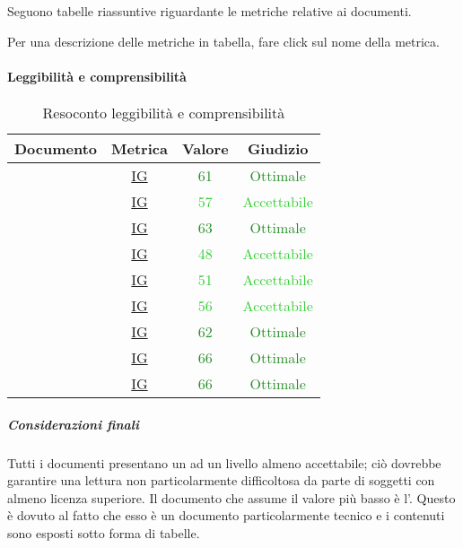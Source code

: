 	Seguono tabelle riassuntive riguardante le metriche relative ai documenti. 
	
	Per una descrizione delle metriche in tabella, fare click sul nome della metrica.
	
	\paragraph{Leggibilità e comprensibilità}
		\begin{table}[H]
			\centering
			\small
			\begin{tabular}{c | c | c | c}
				\hline
				\textbf{Documento} & \textbf{Metrica}    & \textbf{Valore} & \textbf{Giudizio} \\ \hline
					\pdpvdue        & \hyperref[MLEC]{IG} & \textcolor{ForestGreen}{61} & \textcolor{ForestGreen}{Ottimale} \\
					\pdqvdue        & \hyperref[MLEC]{IG} & \textcolor{LimeGreen}{57} & \textcolor{LimeGreen}{Accettabile} \\
					\ndpvdue        & \hyperref[MLEC]{IG} & \textcolor{ForestGreen}{63} & \textcolor{ForestGreen}{Ottimale} \\
					\adrvdue        & \hyperref[MLEC]{IG}  & \textcolor{LimeGreen}{48} & \textcolor{LimeGreen}{Accettabile} \\
					\stvuno		& \hyperref[MLEC]{IG}  & \textcolor{LimeGreen}{51} & \textcolor{LimeGreen}{Accettabile} \\
					\glvdue        & \hyperref[MLEC]{IG} & \textcolor{LimeGreen}{56} & \textcolor{LimeGreen}{Accettabile} \\
					\vcinquei       & \hyperref[MLEC]{IG}& \textcolor{ForestGreen}{62} & \textcolor{ForestGreen}{Ottimale} \\
					\vseii       & \hyperref[MLEC]{IG} &  \textcolor{ForestGreen}{66} & \textcolor{ForestGreen}{Ottimale} \\
					\vtree       & \hyperref[MLEC]{IG}& \textcolor{ForestGreen}{66} & \textcolor{ForestGreen}{Ottimale} \\
			\end{tabular}
			\caption{Resoconto leggibilità e comprensibilità}
			\label{tab_resoconto_leggibilità_e_comprensibilità2}
		\end{table}
	
		\subparagraph{Considerazioni finali}
		Tutti i documenti presentano un  ad un livello almeno accettabile; ciò dovrebbe garantire una lettura non particolarmente difficoltosa da parte di soggetti con almeno licenza superiore.
		Il documento che assume il valore più basso è l'\adrvdue. Questo è dovuto al fatto che esso è un documento particolarmente tecnico e i contenuti sono esposti sotto forma di tabelle.	
